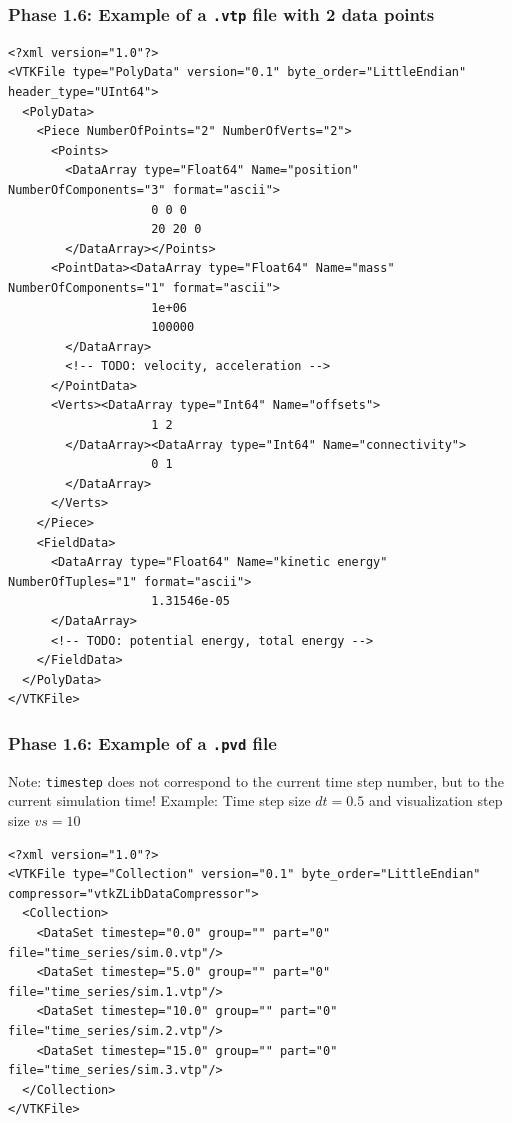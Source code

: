 \begin{frame}[fragile]
  \frametitle{Phase 1.6: Example of a \texttt{.vtp} file with 2 data points}
  \setfontsize{5.3pt}
    \begin{verbatim}
<?xml version="1.0"?>
<VTKFile type="PolyData" version="0.1" byte_order="LittleEndian" header_type="UInt64">
  <PolyData>
    <Piece NumberOfPoints="2" NumberOfVerts="2">
      <Points>
        <DataArray type="Float64" Name="position" NumberOfComponents="3" format="ascii">
                    0 0 0
                    20 20 0
        </DataArray></Points>
      <PointData><DataArray type="Float64" Name="mass" NumberOfComponents="1" format="ascii">
                    1e+06
                    100000
        </DataArray>
        <!-- TODO: velocity, acceleration -->
      </PointData>
      <Verts><DataArray type="Int64" Name="offsets">
                    1 2
        </DataArray><DataArray type="Int64" Name="connectivity">
                    0 1
        </DataArray>
      </Verts>
    </Piece>
    <FieldData>
      <DataArray type="Float64" Name="kinetic energy" NumberOfTuples="1" format="ascii">
                    1.31546e-05
      </DataArray>
      <!-- TODO: potential energy, total energy -->
    </FieldData>
  </PolyData>
</VTKFile>
  \end{verbatim}
\end{frame}

\begin{frame}[fragile]
  \frametitle{Phase 1.6: Example of a \texttt{.pvd} file}
  Note: \texttt{timestep} does not correspond to the current time step number, but to the current simulation time!
  \vfill
  Example: Time step size $dt = 0.5$ and visualization step size $vs = 10$
  \setfontsize{7.2pt}
  \begin{verbatim}
<?xml version="1.0"?>
<VTKFile type="Collection" version="0.1" byte_order="LittleEndian" compressor="vtkZLibDataCompressor">
  <Collection>
    <DataSet timestep="0.0" group="" part="0" file="time_series/sim.0.vtp"/>
    <DataSet timestep="5.0" group="" part="0" file="time_series/sim.1.vtp"/>
    <DataSet timestep="10.0" group="" part="0" file="time_series/sim.2.vtp"/>
    <DataSet timestep="15.0" group="" part="0" file="time_series/sim.3.vtp"/>
  </Collection>
</VTKFile>
  \end{verbatim}
\end{frame}

